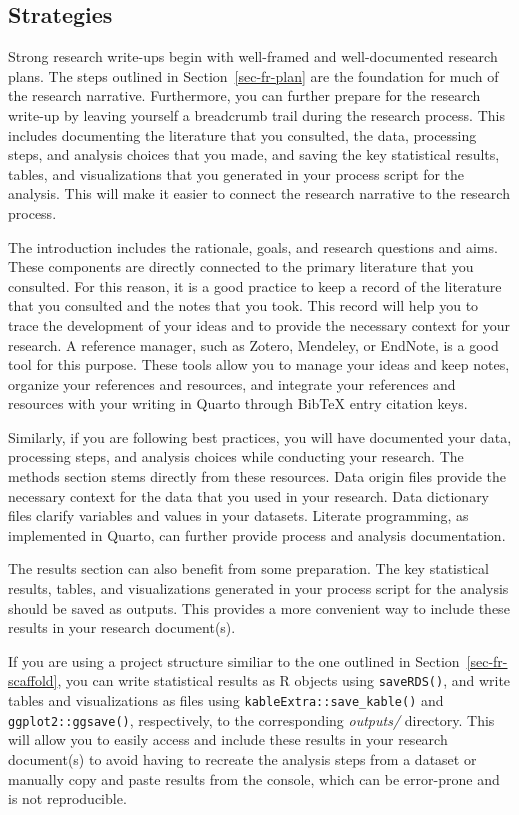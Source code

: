 \documentclass[
  letterpaper,
]{latex/krantz}
\theoremstyle{definition}
\theoremstyle{remark}
\begin{document}
\subsection{Strategies}\label{sec-contr-ao-strategies}

Strong research write-ups begin with well-framed and well-documented
research plans. The steps outlined in Section~\ref{sec-fr-plan} are the
foundation for much of the research narrative. Furthermore, you can
further prepare for the research write-up by leaving yourself a
breadcrumb trail during the research process. This includes documenting
the literature that you consulted, the data, processing steps, and
analysis choices that you made, and saving the key statistical results,
tables, and visualizations that you generated in your process script for
the analysis. This will make it easier to connect the research narrative
to the research process.

The introduction includes the rationale, goals, and research questions
and aims. These components are directly connected to the primary
literature that you consulted. For this reason, it is a good practice to
keep a record of the literature that you consulted and the notes that
you took. This record will help you to trace the development of your
ideas and to provide the necessary context for your research. A
reference manager, such as Zotero, Mendeley, or EndNote, is a good tool
for this purpose. These tools allow you to manage your ideas and keep
notes, organize your references and resources, and integrate your
references and resources with your writing in Quarto through BibTeX
entry citation keys.

Similarly, if you are following best practices, you will have documented
your data, processing steps, and analysis choices while conducting your
research. The methods section stems directly from these resources. Data
origin files provide the necessary context for the data that you used in
your research. Data dictionary files clarify variables and values in
your datasets. Literate programming, as implemented in Quarto, can
further provide process and analysis documentation.

The results section can also benefit from some preparation. The key
statistical results, tables, and visualizations generated in your
process script for the analysis should be saved as outputs. This
provides a more convenient way to include these results in your research
document(s).

If you are using a project structure similiar to the one outlined in
Section~\ref{sec-fr-scaffold}, you can write statistical results as R
objects using \texttt{saveRDS()}, and write tables and visualizations as
files using \texttt{kableExtra::save\_kable()} and
\texttt{ggplot2::ggsave()}, respectively, to the corresponding
\emph{outputs/} directory. This will allow you to easily access and
include these results in your research document(s) to avoid having to
recreate the analysis steps from a dataset or manually copy and paste
results from the console, which can be error-prone and is not
reproducible.
\end{document}
